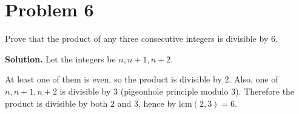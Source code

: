 \section*{Problem 6}

Prove that the product of any three consecutive integers is divisible by $6$.

\textbf{Solution.}
Let the integers be $n,n+1,n+2$.

At least one of them is even, so the product is divisible by $2$.
Also, one of $n,n+1,n+2$ is divisible by $3$ (pigeonhole principle modulo $3$).
Therefore the product is divisible by both $2$ and $3$, hence by $\mathrm{lcm}(2,3)=6$.
